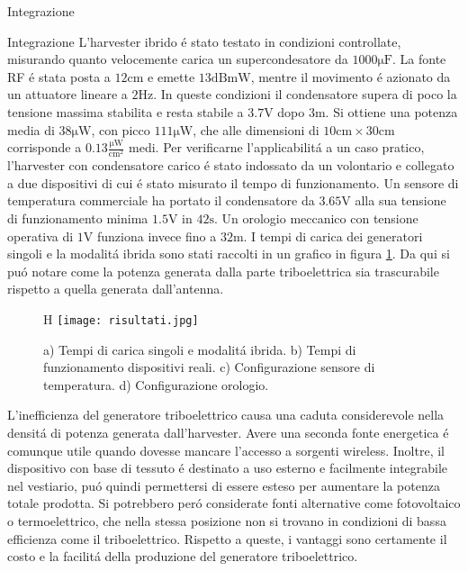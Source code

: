 \begin{section}{Integrazione}
    \begin{subsection}{Integrazione}
        L'harvester ibrido \'e stato testato in condizioni controllate, misurando quanto velocemente carica un supercondesatore da \(1000\mathrm{\mu F}\). La fonte RF \'e stata posta a \(12\mathrm{cm}\) e emette \(13\mathrm{dBmW}\), mentre il movimento \'e azionato da un attuatore lineare a \(2\mathrm{Hz}\). In queste condizioni il condensatore supera di poco la tensione massima stabilita e resta stabile a \(3.7\mathrm{V}\) dopo \(3\mathrm{m}\). Si ottiene una potenza media di \(38\mathrm{\mu W}\), con picco \(111\mathrm{\mu W}\), che alle dimensioni di \(10\mathrm{cm}\times30\mathrm{cm}\) corrisponde a \(0.13\mathrm{ \frac{\mu W}{cm^2}}\) medi. Per verificarne l'applicabilit\'a a un caso pratico, l'harvester con condensatore carico \'e stato indossato da un volontario e collegato a due dispositivi di cui \'e stato misurato il tempo di funzionamento. Un sensore di temperatura commerciale ha portato il condensatore da \(3.65\mathrm{V}\) alla sua tensione di funzionamento minima \(1.5\mathrm{V}\) in \(42\mathrm{s}\). Un orologio meccanico con tensione operativa di \(1\mathrm{V}\) funziona invece fino a \(32\mathrm{m}\).
        I tempi di carica dei generatori singoli e la modalit\'a ibrida sono stati raccolti in un grafico in figura \ref{fig:risultati}. Da qui si pu\'o notare come la potenza generata dalla parte triboelettrica sia trascurabile rispetto a quella generata dall'antenna.
        \begin{figure}{H}
            \texttt{[image: risultati.jpg]}
            \centering
            \caption{a) Tempi di carica singoli e modalit\'a ibrida. b) Tempi di funzionamento dispositivi reali. c) Configurazione sensore di temperatura. d) Configurazione orologio. \cite{kouWearableAllFabricHybrid2024}}
            \label{fig:risultati}
        \end{figure}
        L'inefficienza del generatore triboelettrico causa una caduta considerevole nella densit\'a di potenza generata dall'harvester. Avere una seconda fonte energetica \'e comunque utile quando dovesse mancare l'accesso a sorgenti wireless. Inoltre, il dispositivo con base di tessuto \'e destinato a uso esterno e facilmente integrabile nel vestiario, pu\'o quindi permettersi di essere esteso per aumentare la potenza totale prodotta. Si potrebbero per\'o considerate fonti alternative come fotovoltaico o termoelettrico, che nella stessa posizione non si trovano in condizioni di bassa efficienza come il triboelettrico. Rispetto a queste, i vantaggi sono certamente il costo e la facilit\'a della produzione del generatore triboelettrico.
    \end{subsection}



\end{section}